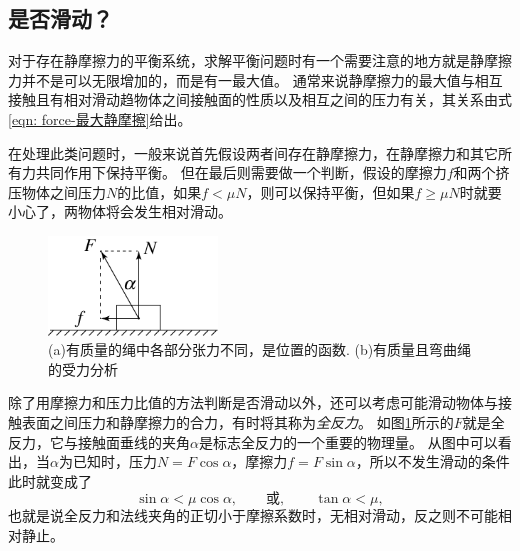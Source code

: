 \subsection{是否滑动？}

对于存在静摩擦力的平衡系统，求解平衡问题时有一个需要注意的地方就是静摩擦力并不是可以无限增加的，而是有一最大值。
通常来说静摩擦力的最大值与相互接触且有相对滑动趋物体之间接触面的性质以及相互之间的压力有关，其关系由式\ref{eqn: force-最大静摩擦}给出。

在处理此类问题时，一般来说首先假设两者间存在静摩擦力，在静摩擦力和其它所有力共同作用下保持平衡。
但在最后则需要做一个判断，假设的摩擦力$f$和两个挤压物体之间压力$N$的比值，如果$f< \mu N$，则可以保持平衡，但如果$f\ge \mu N$时就要小心了，两物体将会发生相对滑动。


\begin{figure}[htbp]
\begin{center}
\includegraphics[width = 0.4\textwidth]{images/static-force-32.pdf} 
\caption{(a)有质量的绳中各部分张力不同，是位置的函数. (b)有质量且弯曲绳的受力分析}
\label{fig: force-支持力、摩擦力和全反力}
\end{center}
\end{figure}

除了用摩擦力和压力比值的方法判断是否滑动以外，还可以考虑可能滑动物体与接触表面之间压力和静摩擦力的合力，有时将其称为\emph{全反力}。
如图\ref{fig: force-支持力、摩擦力和全反力}所示的$F$就是全反力，它与接触面垂线的夹角$\alpha$是标志全反力的一个重要的物理量。
从图中可以看出，当$\alpha$为已知时，压力$N = F\cos\alpha$，摩擦力$f=F\sin\alpha$，所以不发生滑动的条件此时就变成了
\begin{equation}
\sin \alpha < \mu\cos\alpha,\qquad \text{或},\qquad \tan\alpha < \mu,
\end{equation}
也就是说全反力和法线夹角的正切小于摩擦系数时，无相对滑动，反之则不可能相对静止。


